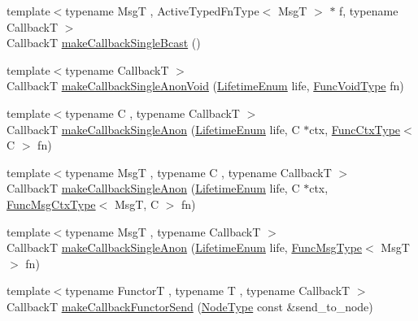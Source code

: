 \begin{DoxyCompactItemize}
\item 
{\footnotesize template$<$typename MsgT , Active\+Typed\+Fn\+Type$<$ Msg\+T $>$ $\ast$ f, typename CallbackT $>$ }\\CallbackT \hyperlink{structvt_1_1pipe_1_1_pipe_manager_t_l_a44999ebff93b29e571e928b0695ed120}{make\+Callback\+Single\+Bcast} ()
\item 
{\footnotesize template$<$typename CallbackT $>$ }\\CallbackT \hyperlink{structvt_1_1pipe_1_1_pipe_manager_t_l_a92e209618d7e21e150a1f13ae4e813d4}{make\+Callback\+Single\+Anon\+Void} (\hyperlink{namespacevt_1_1pipe_acb42b284378c0fdac1d7c6335dc26f58}{Lifetime\+Enum} life, \hyperlink{structvt_1_1pipe_1_1_pipe_manager_base_acd6f0c71f38f08d53f85e83b65406d77}{Func\+Void\+Type} fn)
\item 
{\footnotesize template$<$typename C , typename CallbackT $>$ }\\CallbackT \hyperlink{structvt_1_1pipe_1_1_pipe_manager_t_l_ac74f387c8ea9f25e11ca53841cd01779}{make\+Callback\+Single\+Anon} (\hyperlink{namespacevt_1_1pipe_acb42b284378c0fdac1d7c6335dc26f58}{Lifetime\+Enum} life, C $\ast$ctx, \hyperlink{structvt_1_1pipe_1_1_pipe_manager_base_ad8463823b6b4cfdb67c119d6d22e3bac}{Func\+Ctx\+Type}$<$ C $>$ fn)
\item 
{\footnotesize template$<$typename MsgT , typename C , typename CallbackT $>$ }\\CallbackT \hyperlink{structvt_1_1pipe_1_1_pipe_manager_t_l_aa84891c7d419709ee96473a895d07ae7}{make\+Callback\+Single\+Anon} (\hyperlink{namespacevt_1_1pipe_acb42b284378c0fdac1d7c6335dc26f58}{Lifetime\+Enum} life, C $\ast$ctx, \hyperlink{structvt_1_1pipe_1_1_pipe_manager_base_a73fdf82ece0411b3dc644c99b763f7a9}{Func\+Msg\+Ctx\+Type}$<$ MsgT, C $>$ fn)
\item 
{\footnotesize template$<$typename MsgT , typename CallbackT $>$ }\\CallbackT \hyperlink{structvt_1_1pipe_1_1_pipe_manager_t_l_a1b3d31ba2e73d77ef2ed5c7f752d2eb9}{make\+Callback\+Single\+Anon} (\hyperlink{namespacevt_1_1pipe_acb42b284378c0fdac1d7c6335dc26f58}{Lifetime\+Enum} life, \hyperlink{structvt_1_1pipe_1_1_pipe_manager_base_aa54eee64ab32a27777a672d49eb861f4}{Func\+Msg\+Type}$<$ MsgT $>$ fn)
\item 
{\footnotesize template$<$typename FunctorT , typename T , typename CallbackT $>$ }\\CallbackT \hyperlink{structvt_1_1pipe_1_1_pipe_manager_t_l_a2e9eb336fb5e2f6927b64068411ff2c8}{make\+Callback\+Functor\+Send} (\hyperlink{namespacevt_a866da9d0efc19c0a1ce79e9e492f47e2}{Node\+Type} const \&send\+\_\+to\+\_\+node)

\end{DoxyCompactItemize}
